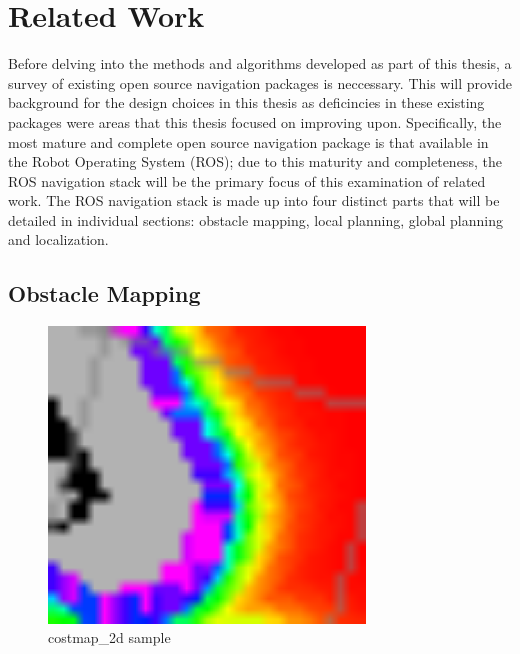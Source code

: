 \section{Related Work}\label{sec:related_work}

Before delving into the methods and algorithms developed as part of this thesis, a survey of existing open source navigation packages is neccessary. This will provide background for the design choices in this thesis as deficincies in these existing packages were areas that this thesis focused on improving upon. Specifically, the most mature and complete open source navigation package is that available in the Robot Operating System (ROS)\autocite{Marder-Eppstein2010}; due to this maturity and completeness, the ROS navigation stack will be the primary focus of this examination of related work. The ROS navigation stack is made up into four distinct parts that will be detailed in individual sections: obstacle mapping, local planning, global planning and localization.

\subsection{Obstacle Mapping}\label{subsec:costmap_2d}

\begin{figure}
\centering
\includegraphics[width=0.75\textwidth]{images/costmap_2d_costgradient}
\caption{costmap\_2d sample \label{fig:costmap_2d_costgradient}}
\end{figure}

